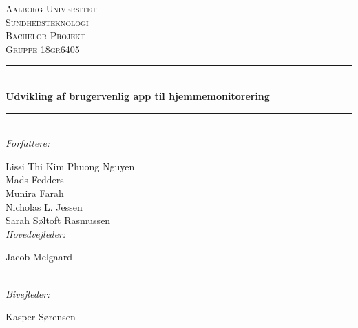 \thispagestyle{empty}
\newcommand{\HRule}{\rule{\linewidth}{0.5mm}} %

\begin{center} %

\textsc{\LARGE Aalborg Universitet}\\[1.0cm] %
\textsc{\Large Sundhedsteknologi}\\[0.5cm] %
\textsc{\Large Bachelor Projekt}\\[0.5cm] %
\textsc{\large Gruppe 18gr6405}\\[0.5cm] %


\HRule \\[0.4cm]
{ \huge \bfseries Udvikling af brugervenlig app til hjemmemonitorering}\\[0.2cm] %
\HRule \\[0.4cm]

\emph{Forfattere:}\\
{\large Lissi Thi Kim Phuong Nguyen \\ Mads Fedders \\ Munira Farah \\ Nicholas L. Jessen \\ Sarah Søltoft Rasmussen \\[1.0cm] %

\emph{Hovedvejleder:}\\
{\large Jacob Melgaard \par}\\[0.5cm] %

\emph{Bivejleder:}\\
{\large Kasper Sørensen  \par}\\[2.0cm] %

}
\end{center}
